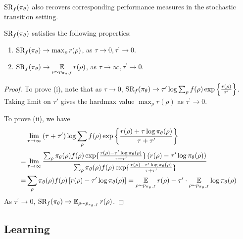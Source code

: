 $\text{SR}_f(\pi_\theta)$ also recovers corresponding performance measures in the stochastic transition setting.
\begin{prop}
\label{prop:sr_stochastic}
$\text{SR}_f(\pi_\theta)$ satisfies the following properties:
\begin{enumerate}[label=(\roman*)]
	\item  $\text{SR}_f(\pi_\theta) \to \max_{\rho}{r(\rho)}$, as $\tau \to 0, \tau^{\prime} \to 0$.
	\item $\text{SR}_f(\pi_\theta) \to \operatorname*{\mathbb{E}}\limits_{\rho \sim p_{\pi_\theta, f}}{r(\rho)}$, as $\tau \to \infty, \tau^{\prime} \to 0$. 
\end{enumerate}	
\end{prop}
\begin{proof}
To prove (i), note that as $\tau \to 0$, $\text{SR}_f(\pi_\theta) \to \tau^{\prime} \log{ \sum_{\rho}{ f(\rho) \exp\left\{ \frac{r(\rho) }{ \tau^{\prime} } \right\} }}$. Taking limit on $\tau'$ gives the hardmax value $\max_{\rho}{r(\rho)}$ as $\tau^{\prime} \to 0$.
	
To prove (ii), we have 
\begin{align*}
	&\lim\limits_{\tau \to \infty}{ (\tau + \tau^{\prime})\log{ \sum_{\rho}{ f(\rho) \exp\left\{ \frac{r(\rho) + \tau \log{\pi_\theta(\rho)} }{\tau + \tau^{\prime}} \right\} }} } \\
	=& \lim\limits_{\tau \to \infty}{ \frac{ \sum_{\rho}{ \pi_\theta(\rho) f(\rho) \exp\{ \frac{r(\rho) - \tau^{\prime} \log{\pi_\theta(\rho)} }{\tau + \tau^{\prime}} \} \left( r(\rho) - \tau^{\prime}\log{\pi_\theta(\rho)} \right) } }{  \sum_{\rho}{ \pi_\theta(\rho) f(\rho) \exp\{ \frac{r(\rho) - \tau^{\prime} \log{\pi_\theta(\rho)} }{\tau + \tau^{\prime}} \} } } } \\
	=& \sum_{\rho}{ \pi_\theta(\rho) f(\rho) \left[ r(\rho) - \tau^{\prime}\log{\pi_\theta(\rho)} \right] } = \operatorname*{\mathbb{E}}\limits_{\rho \sim p_{\pi_\theta, f}}{r(\rho)} -  \tau^{\prime} \cdot \operatorname*{\mathbb{E}}\limits_{\rho \sim p_{\pi_\theta, f}}{  \log{\pi_\theta(\rho)} }
\end{align*}
As $\tau^{\prime} \to 0$, $\text{SR}_f(\pi_\theta) \to \operatorname*{\mathbb{E}}_{\rho \sim p_{\pi_\theta, f}}{r(\rho)}$.
\end{proof}

\subsection{Learning}

